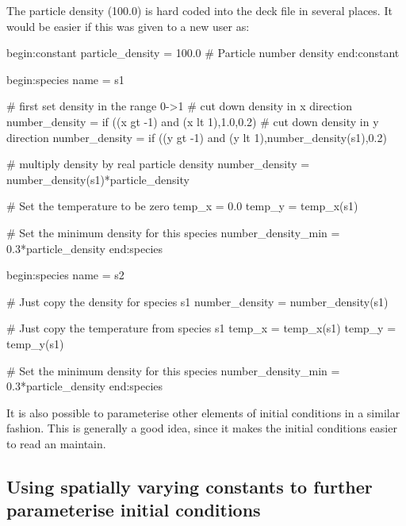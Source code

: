 The particle density (100.0) is hard coded into the deck file in several
places. It would be easier if this was given to a new user as:
\begin{boxverbatim}
begin:constant
   particle_density = 100.0 # Particle number density
end:constant

begin:species
   name = s1

   # first set density in the range 0->1
   # cut down density in x direction
   number_density = if ((x gt -1) and (x lt 1),1.0,0.2)
   # cut down density in y direction
   number_density = if ((y gt -1) and (y lt 1),number_density(s1),0.2)

   # multiply density by real particle density
   number_density = number_density(s1)*particle_density

   # Set the temperature to be zero
   temp_x = 0.0
   temp_y = temp_x(s1)

   # Set the minimum density for this species
   number_density_min = 0.3*particle_density
end:species

begin:species
   name = s2

   # Just copy the density for species s1
   number_density = number_density(s1)

   # Just copy the temperature from species s1
   temp_x = temp_x(s1)
   temp_y = temp_y(s1)

   # Set the minimum density for this species
   number_density_min = 0.3*particle_density
end:species
\end{boxverbatim}

It is also possible to parameterise other elements of initial conditions in a
similar fashion. This is generally a good idea, since it makes the
initial conditions easier to read an maintain.

\subsection{Using spatially varying constants to further parameterise
  initial conditions}

